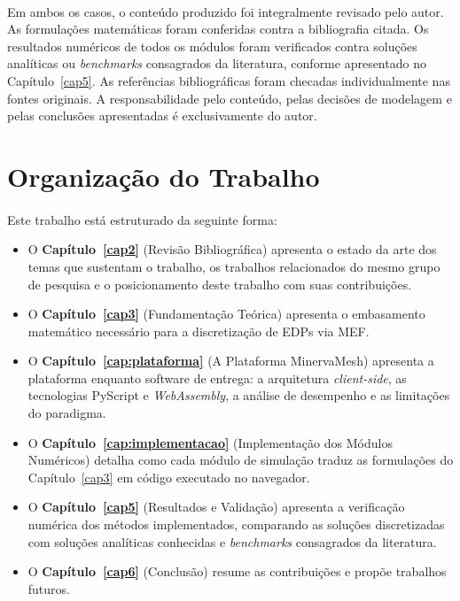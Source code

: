 \paragraph{}Em ambos os casos, o conteúdo produzido foi integralmente revisado pelo autor. As formulações matemáticas foram conferidas contra a bibliografia citada. Os resultados numéricos de todos os módulos foram verificados contra soluções analíticas ou \textit{benchmarks} consagrados da literatura, conforme apresentado no Capítulo~\ref{cap5}. As referências bibliográficas foram checadas individualmente nas fontes originais. A responsabilidade pelo conteúdo, pelas decisões de modelagem e pelas conclusões apresentadas é exclusivamente do autor.

\section{Organização do Trabalho}

\paragraph{}Este trabalho está estruturado da seguinte forma:
\begin{itemize}
    \item O \textbf{Capítulo~\ref{cap2}} (Revisão Bibliográfica) apresenta o estado da arte dos temas que sustentam o trabalho, os trabalhos relacionados do mesmo grupo de pesquisa e o posicionamento deste trabalho com suas contribuições.
    \item O \textbf{Capítulo~\ref{cap3}} (Fundamentação Teórica) apresenta o embasamento matemático necessário para a discretização de EDPs via MEF.
    \item O \textbf{Capítulo~\ref{cap:plataforma}} (A Plataforma MinervaMesh) apresenta a plataforma enquanto software de entrega: a arquitetura \textit{client-side}, as tecnologias PyScript e \textit{WebAssembly}, a análise de desempenho e as limitações do paradigma.
    \item O \textbf{Capítulo~\ref{cap:implementacao}} (Implementação dos Módulos Numéricos) detalha como cada módulo de simulação traduz as formulações do Capítulo~\ref{cap3} em código executado no navegador.
    \item O \textbf{Capítulo~\ref{cap5}} (Resultados e Validação) apresenta a verificação numérica dos métodos implementados, comparando as soluções discretizadas com soluções analíticas conhecidas e \textit{benchmarks} consagrados da literatura.
    \item O \textbf{Capítulo~\ref{cap6}} (Conclusão) resume as contribuições e propõe trabalhos futuros.
\end{itemize}
